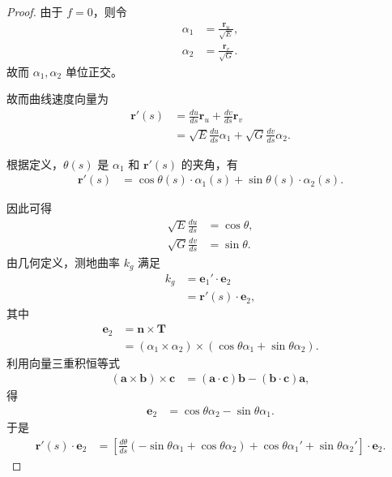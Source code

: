 \documentclass[lang=cn,10pt,thmcnt=section]{elegantbook}
\begin{document}
\begin{proof}
    由于 \( f = 0 \)，则令 
    \begin{align*}
    \alpha_1 &= \frac{\mathbf{r}_u}{\sqrt{E}}, \\
    \alpha_2 &= \frac{\mathbf{r}_v}{\sqrt{G}}.
    \end{align*}
    故而 \(\alpha_1, \alpha_2\) 单位正交。
    
    故而曲线速度向量为
    \begin{align*}
    \mathbf{r}'(s) &= \frac{du}{ds} \mathbf{r}_u + \frac{dv}{ds} \mathbf{r}_v \\
    &= \sqrt{E} \frac{du}{ds} \alpha_1 + \sqrt{G} \frac{dv}{ds} \alpha_2.
    \end{align*}
    
    根据定义，\(\theta(s)\) 是 \(\alpha_1\) 和 \(\mathbf{r}'(s)\) 的夹角，有
    \begin{align*}
    \mathbf{r}'(s) &= \cos\theta(s) \cdot \alpha_1(s) + \sin\theta(s) \cdot \alpha_2(s).
    \end{align*}
    
    因此可得
    \begin{align*}
    \sqrt{E} \frac{du}{ds} &= \cos\theta, \\
    \sqrt{G} \frac{dv}{ds} &= \sin\theta.
    \end{align*}
    由几何定义，测地曲率 \(k_g\) 满足
    \begin{align*}
    k_g &= \mathbf{e}_1' \cdot \mathbf{e}_2 \\
    &= \mathbf{r}'(s) \cdot \mathbf{e}_2,
    \end{align*}
    其中
    \begin{align*}
    \mathbf{e}_2 &= \mathbf{n} \times \mathbf{T} \\
    &= (\alpha_1 \times \alpha_2) \times (\cos\theta  \alpha_1 + \sin\theta  \alpha_2).
    \end{align*}
    利用向量三重积恒等式
    \begin{align*}
    (\mathbf{a} \times \mathbf{b}) \times \mathbf{c} 
    &= (\mathbf{a} \cdot \mathbf{c}) \mathbf{b} - (\mathbf{b} \cdot \mathbf{c}) \mathbf{a},
    \end{align*}
    得
    \begin{align*}
    \mathbf{e}_2 &= \cos\theta  \alpha_2 - \sin\theta  \alpha_1.
    \end{align*}
    于是
    \begin{align*}
    \mathbf{r}'(s) \cdot \mathbf{e}_2 
    &= \left[ \frac{d\theta}{ds} (-\sin\theta  \alpha_1 + \cos\theta  \alpha_2) 
    + \cos\theta  \alpha_1' + \sin\theta  \alpha_2' \right] \cdot \mathbf{e}_2.
    \end{align*}
    

\end{proof}
\end{document}
